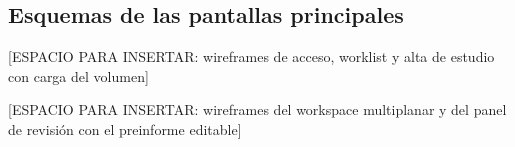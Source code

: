 \subsection{Esquemas de las pantallas principales}

[ESPACIO PARA INSERTAR: wireframes de acceso, worklist y alta de estudio con carga del volumen]


[ESPACIO PARA INSERTAR: wireframes del workspace multiplanar y del panel de revisión con el preinforme editable]


